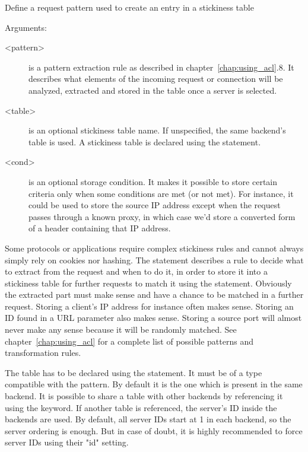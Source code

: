   Define a request pattern used to create an entry in a stickiness table


  Arguments:
  \begin{description}
  \item[<pattern>] is a pattern extraction rule as described in chapter~\ref{chap:using_acl}.8. It
               describes what elements of the incoming request or connection
               will be analyzed, extracted and stored in the table once a
               server is selected.

  \item[<table>] is an optional stickiness table name. If unspecified, the same
               backend's table is used. A stickiness table is declared using
               the  statement.

  \item[<cond>] is an optional storage condition. It makes it possible to store
               certain criteria only when some conditions are met (or not met).
               For instance, it could be used to store the source IP address
               except when the request passes through a known proxy, in which
               case we'd store a converted form of a header containing that IP
               address.
  \end{description}

  Some protocols or applications require complex stickiness rules and cannot
  always simply rely on cookies nor hashing. The  statement
  describes a rule to decide what to extract from the request and when to do
  it, in order to store it into a stickiness table for further requests to
  match it using the  statement. Obviously the extracted part must
  make sense and have a chance to be matched in a further request. Storing a
  client's IP address for instance often makes sense. Storing an ID found in a
  URL parameter also makes sense. Storing a source port will almost never make
  any sense because it will be randomly matched. See chapter~\ref{chap:using_acl} for a complete
  list of possible patterns and transformation rules.

  The table has to be declared using the  statement. It must be of
  a type compatible with the pattern. By default it is the one which is present
  in the same backend. It is possible to share a table with other backends by
  referencing it using the  keyword. If another table is referenced,
  the server's ID inside the backends are used. By default, all server IDs
  start at 1 in each backend, so the server ordering is enough. But in case of
  doubt, it is highly recommended to force server IDs using their "id" setting.

